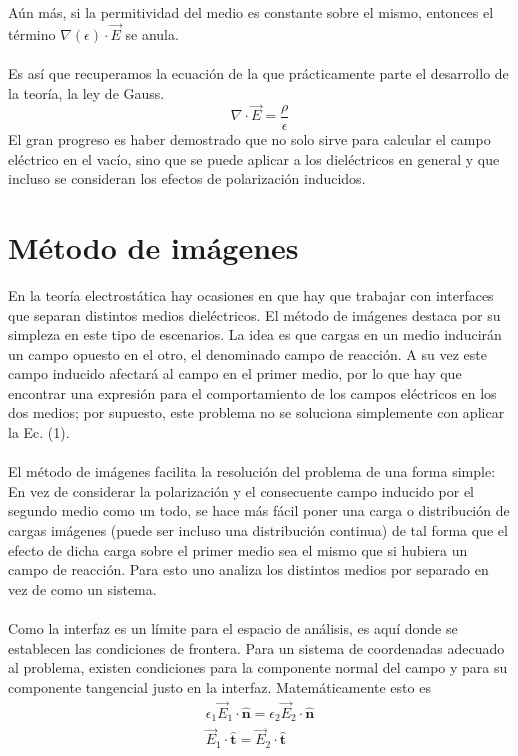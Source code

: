 \documentclass[12pt, oneside, numbers, spanish]{ezthesis}
\numberwithin{equation}{section}
\begin{document}
Aún más, si la permitividad del medio es constante sobre el mismo, entonces el término $\nabla (\epsilon)\cdot\vec{E}$ se anula.\\\\
Es así que recuperamos la ecuación de la que prácticamente parte el desarrollo de la teoría, la ley de Gauss.
\begin{equation}
\nabla\cdot\vec{E} = \frac{\rho}{\epsilon}
\end{equation}
El gran progreso es haber demostrado que no solo sirve para calcular el campo eléctrico en el vacío, sino que se puede aplicar a los dieléctricos en general y que incluso se consideran los efectos de polarización inducidos.

\section{Método de imágenes}
En la teoría electrostática hay ocasiones en que hay que trabajar con interfaces que separan distintos medios dieléctricos. El método de imágenes destaca por su simpleza en este tipo de escenarios. La idea es que cargas en un medio inducirán un campo opuesto en el otro, el denominado campo de reacción. A su vez este campo inducido afectará al campo en el primer medio, por lo que hay que encontrar una expresión para el comportamiento de los campos eléctricos en los dos medios; por supuesto, este problema no se soluciona simplemente con aplicar la Ec. (1).\\\\
El método de imágenes facilita la resolución del problema de una forma simple: En vez de considerar la polarización y el consecuente campo inducido por el segundo medio como un todo, se hace más fácil poner una carga o distribución de cargas imágenes (puede ser incluso una distribución continua) de tal forma que el efecto de dicha carga sobre el primer medio sea el mismo que si hubiera un campo de reacción. Para esto uno analiza los distintos medios por separado en vez de como un sistema.\\\\
Como la interfaz es un límite para el espacio de análisis, es aquí donde se establecen las condiciones de frontera. Para un sistema de coordenadas adecuado al problema, existen condiciones para la componente normal del campo y para su componente tangencial justo en la interfaz. Matemáticamente esto es
\begin{gather}
\epsilon_1\vec{E}_1\cdot\hat{\mathbf{n}} = \epsilon_2\vec{E}_2\cdot\hat{\mathbf{n}}\\
\vec{E}_1\cdot\hat{\mathbf{t}} = \vec{E}_2\cdot\hat{\mathbf{t}}
\end{gather}
\end{document}
